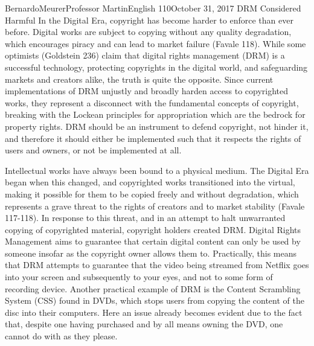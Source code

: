 \documentclass[12pt,letterpaper]{article}
\begin{document}
\begin{mla}{Bernardo}{Meurer}{Professor Martin}{English 110}{October 31, 2017}%
    {DRM Considered Harmful}
    In the Digital Era, copyright has become harder to enforce than ever before. Digital works are subject to copying without any quality degradation, which encourages piracy and can lead to market failure (Favale 118). While some optimists (Goldstein 236) claim that digital rights management (DRM) is a successful technology, protecting copyrights in the digital world, and safeguarding markets and creators alike, the truth is quite the opposite. Since current implementations of DRM unjustly and broadly harden access to copyrighted works, they represent a disconnect with the fundamental concepts of copyright, breaking with the Lockean principles for appropriation which are the bedrock for property rights. DRM should be an instrument to defend copyright, not hinder it, and therefore it should either be implemented such that it respects the rights of users and owners, or not be implemented at all.

    Intellectual works have always been bound to a physical medium. The Digital Era began when this changed, and copyrighted works transitioned into the virtual, making it possible for them to be copied freely and without degradation, which represents a grave threat to the rights of creators and to market stability (Favale 117-118). In response to this threat, and in an attempt to halt unwarranted copying of copyrighted material, copyright holders created DRM. Digital Rights Management aims to guarantee that certain digital content can only be used by someone insofar as the copyright owner allows them to. Practically, this means that DRM attempts to guarantee that the video being streamed from Netflix goes into your screen and subsequently to your eyes, and not to some form of recording device. Another practical example of DRM is the Content Scrambling System (CSS) found in DVDs, which stops users from copying the content of the disc into their computers. Here an issue already becomes evident due to the fact that, despite one having purchased and by all means owning the DVD, one cannot do with as they please.


\end{mla}
\end{document}
